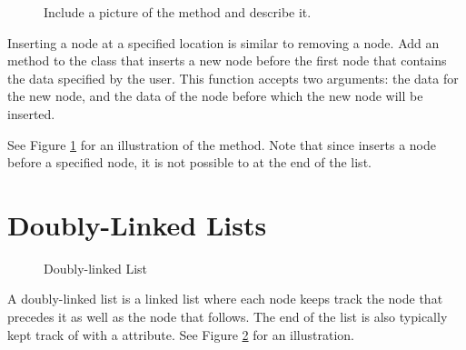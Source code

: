 \begin{figure}
\centering
\caption{Include a picture of the  method and describe it.}
\label{fig:insert}
\end{figure}

\begin{problem}
Inserting a node at a specified location is similar to removing a node.
Add an  method to the  class that inserts a new node before the first node that contains the data specified by the user.
This function accepts two arguments: the data for the new node, and the data of the node before which the new node will be inserted.

See Figure \ref{fig:insert} for an illustration of the  method.
Note that since  inserts a node before a specified node, it is not possible to  at the end of the list.
\end{problem}

\section*{Doubly-Linked Lists}

\begin{figure}
\centering
{}
\caption{Doubly-linked List}
\label{fig:doubly_linked}
\end{figure}

A doubly-linked list is a linked list where each node keeps track the node that precedes it as well as the node that follows.
The end of the list is also typically kept track of with a  attribute.
See Figure \ref{fig:doubly_linked} for an illustration.


